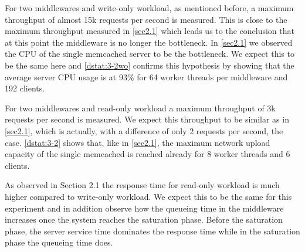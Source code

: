 \documentclass[11pt,a4paper]{article}
\begin{document}
For two middlewares and write-only workload, as mentioned before, a maximum throughput of almost 15k requests per second is measured. This is close to the maximum throughput measured in \autoref{sec2.1} which leads us to the conclusion that at this point the middleware is no longer the bottleneck. In \autoref{sec2.1} we observed the CPU of the single memcached server to be the bottleneck. We expect this to be the same here and \autoref{dstat:3-2wo} confirms this hypothesis by showing that the average server CPU usage is at 93\% for 64 worker threads per middleware and 192 clients.

For two middlewares and read-only workload a maximum throughput of 3k requests per second is measured. We expect this throughput to be similar as in \autoref{sec2.1}, which is actually, with a difference of only 2 requests per second, the case. \autoref{dstat:3-2} shows that, like in \autoref{sec2.1}, the maximum network upload capacity of the single memcached is reached already for 8 worker threads and 6 clients.

As observed in Section 2.1 the response time for read-only workload is much higher compared to write-only workload. We expect this to be the same for this experiment and in addition observe how the queueing time in the middleware increases once the system reaches the saturation phase. Before the saturation phase, the server service time dominates the response time while in the saturation phase the queueing time does.
\end{document}
